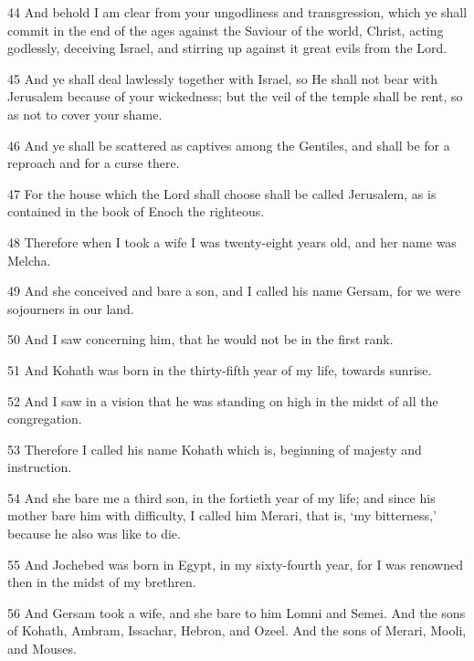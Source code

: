 \par 44 And behold I am clear from your ungodliness and transgression, which ye shall commit in the end of the ages against the Saviour of the world, Christ, acting godlessly, deceiving Israel, and stirring up against it great evils from the Lord.

\par 45 And ye shall deal lawlessly together with Israel, so He shall not bear with Jerusalem because of your wickedness; but the veil of the temple shall be rent, so as not to cover your shame.

\par 46 And ye shall be scattered as captives among the Gentiles, and shall be for a reproach and for a curse there.

\par 47 For the house which the Lord shall choose shall be called Jerusalem, as is contained in the book of Enoch the righteous.

\par 48 Therefore when I took a wife I was twenty-eight years old, and her name was Melcha.

\par 49 And she conceived and bare a son, and I called his name Gersam, for we were sojourners in our land.

\par 50 And I saw concerning him, that he would not be in the first rank.

\par 51 And Kohath was born in the thirty-fifth year of my life, towards sunrise.

\par 52 And I saw in a vision that he was standing on high in the midst of all the congregation.

\par 53 Therefore I called his name Kohath which is, beginning of majesty and instruction.

\par 54 And she bare me a third son, in the fortieth year of my life; and since his mother bare him with difficulty, I called him Merari, that is, ‘my bitterness,’ because he also was like to die.

\par 55 And Jochebed was born in Egypt, in my sixty-fourth year, for I was renowned then in the midst of my brethren.

\par 56 And Gersam took a wife, and she bare to him Lomni and Semei. And the sons of Kohath, Ambram, Issachar, Hebron, and Ozeel. And the sons of Merari, Mooli, and Mouses.

